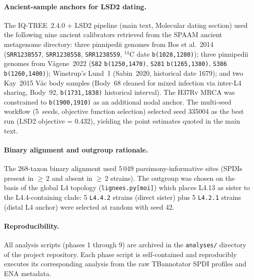 \documentclass[11pt,a4paper]{article}
\begin{document}
\paragraph{Ancient-sample anchors for LSD2 dating.}
The IQ-TREE~2.4.0 + LSD2 pipeline (main text, Molecular dating
section) used the following nine ancient calibrators retrieved
from the SPAAM ancient metagenome directory: three pinnipedii
genomes from Bos et al.\ 2014 (\texttt{SRR1238557},
\texttt{SRR1238558}, \texttt{SRR1238559}, $^{14}$C date
\texttt{b(1028,1280)}); three pinnipedii genomes from
V{\aa}gene~2022 (\texttt{S82} \texttt{b(1250,1470)},
\texttt{S281} \texttt{b(1265,1380)}, \texttt{S386}
\texttt{b(1260,1400)}); Winstrup's Lund~1 (Sabin~2020,
historical date 1679); and two Kay~2015 V{\'a}c body samples
(Body~68 cleaned for mixed infection via inter-L4 sharing,
Body~92, \texttt{b(1731,1838)} historical interval). The H37Rv
MRCA was constrained to \texttt{b(1900,1910)} as an additional
nodal anchor. The multi-seed workflow (5~seeds, objective
function selection) selected seed 335004 as the best run
(LSD2 objective = 0.432), yielding the point estimates quoted
in the main text.

\paragraph{Binary alignment and outgroup rationale.}
The 268-taxon binary alignment used 5\,049 parsimony-informative
sites (SPDIs present in $\geq$\,2 and absent in $\geq$\,2
strains). The outgroup was chosen on the basis of the global L4
topology (\texttt{lignees.py[moi]}) which places L4.13 as sister
to the L4.4-containing clade: 5 \texttt{L4.4.2} strains (direct
sister) plus 5 \texttt{L4.2.1} strains (distal L4 anchor) were
selected at random with seed 42.

\paragraph{Reproducibility.}
All analysis scripts (phases 1 through 9) are archived in the
\texttt{analyses/} directory of the project repository. Each
phase script is self-contained and reproducibly executes its
corresponding analysis from the raw TBannotator SPDI profiles
and ENA metadata.
\end{document}
